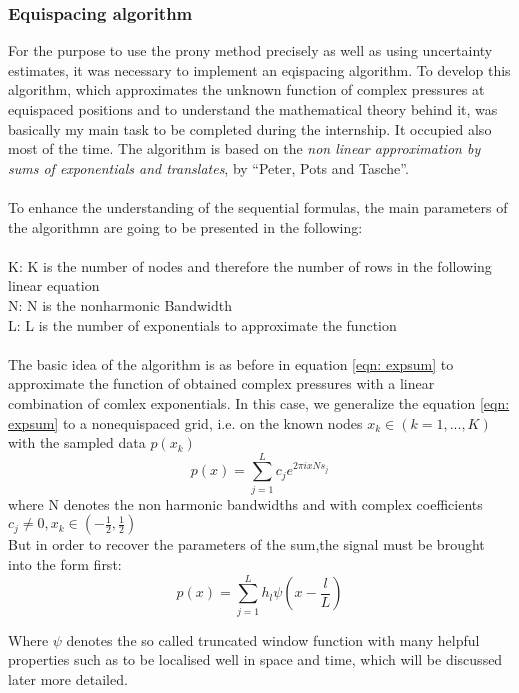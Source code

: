 \documentclass{article}
\begin{document}
\subsubsection{Equispacing algorithm}
For the purpose to use the prony method precisely as well as using uncertainty estimates, it was necessary to implement an eqispacing algorithm.
To develop this algorithm, which approximates the unknown function of complex pressures at equispaced positions and to understand the mathematical theory behind it, was basically my main task to be completed during the internship. It occupied also most of the time. The algorithm is based on the \textit{non linear approximation by sums of exponentials and translates}, by “Peter, Pots and Tasche”. \cite{Peter2011} \\\\
To enhance the understanding of the sequential formulas, the main parameters of the algorithmn are going to be presented in the following:
\\\\
 K: K is the number of nodes and therefore the number of rows in the following linear equation\\
 N: N is the nonharmonic Bandwidth\\
 L: L is the number of exponentials to approximate the function
\\\\
The basic idea of the algorithm is as before in equation \eqref{eqn: expsum} to approximate the function of obtained complex pressures with a linear combination of comlex exponentials.
In this case, we generalize the equation \eqref{eqn: expsum} to a nonequispaced grid, i.e. on the known nodes $x_{k}\in (k=1,...,K)$ with the sampled data  $p(x_{k}) $
\\
\begin{equation}
 p(x)=\sum\limits_{j=1}^L c_{j}e^{2\pi ixNs_{j}}
\end{equation}
where N denotes the non harmonic bandwidths and with complex coefficients $c_{j}\neq0, x_{k} \in (-\frac{1}{2},\frac{1}{2})$
\\
But in order to recover the parameters of the sum,the signal must be brought into the form first:  
\begin{equation}\label{eqn:truncatedw}
 p(x)=\sum\limits_{j=1}^L h_{l}\psi(x-\frac{l}{L})
\end{equation}

Where $\psi$ denotes the so called truncated window function with many helpful properties such as to be localised well in space and time, which will be discussed later more detailed. \\
\end{document}

